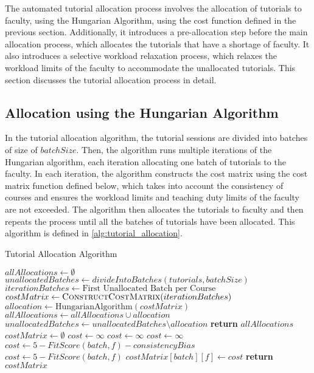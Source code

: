 The automated tutorial allocation process involves the allocation of tutorials to faculty, using the Hungarian Algorithm, using the cost function defined in the previous section. Additionally, it introduces a pre-allocation step before the main allocation process, which allocates the tutorials that have a shortage of faculty. It also introduces a selective workload relaxation process, which relaxes the workload limits of the faculty to accommodate the unallocated tutorials. This section discusses the tutorial allocation process in detail.

\subsection{Allocation using the Hungarian Algorithm}

In the tutorial allocation algorithm, the tutorial sessions are divided into batches of size of $batchSize$. Then, the algorithm runs multiple iterations of the Hungarian algorithm, each iteration allocating one batch of tutorials to the faculty. In each iteration, the algorithm constructs the cost matrix using the cost matrix function defined below, which takes into account the consistency of courses and ensures the workload limits and teaching duty limits of the faculty are not exceeded. The algorithm then allocates the tutorials to faculty and then repeats the process until all the batches of tutorials have been allocated. This algorithm is defined in \autoref{alg:tutorial_allocation}.

\begin{algorithm}[H]
  \caption{Tutorial Allocation Algorithm}
  \begin{algorithmic}
    \State $allAllocations \gets \emptyset$
    \State $unallocatedBatches \gets divideIntoBatches(tutorials, batchSize)$
    \State $iterationBatches \gets \text{First Unallocated Batch per Course}$
    \State $costMatrix \gets \Call{ConstructCostMatrix}{iterationBatches}$
    \State $allocation \gets \text{HungarianAlgorithm}(costMatrix)$
    \State $allAllocations \gets allAllocations \cup allocation$
    \State $unallocatedBatches \gets unallocatedBatches \setminus allocation$
    \EndWhile
    \State \textbf{return} $allAllocations$
    \EndProcedure
    \\
    \State $costMatrix \gets \emptyset$
    \State $cost \gets \infty$
    \State $cost \gets \infty$
    \State $cost \gets \infty$
    \State $cost \gets 5 - FitScore(batch, f) - consistencyBias$
    \Else
    \State $cost \gets 5 - FitScore(batch, f)$
    \EndIf
    \State $costMatrix[batch][f] \gets cost$
    \EndFor
    \EndFor
    \State \textbf{return} $costMatrix$
    \EndProcedure
  \end{algorithmic}
  \label{alg:tutorial_allocation}
\end{algorithm}

